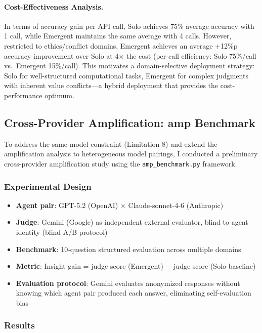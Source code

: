\documentclass[12pt]{article}
\begin{document}
\paragraph{Cost-Effectiveness Analysis.}
In terms of accuracy gain per API call, Solo achieves 75\% average accuracy with 1 call, while Emergent maintains the same average with 4 calls. However, restricted to ethics/conflict domains, Emergent achieves an average +12\%p accuracy improvement over Solo at 4$\times$ the cost (per-call efficiency: Solo 75\%/call vs.\ Emergent 15\%/call). This motivates a domain-selective deployment strategy: Solo for well-structured computational tasks, Emergent for complex judgments with inherent value conflicts---a hybrid deployment that provides the cost-performance optimum.

\subsection{Cross-Provider Amplification: amp Benchmark}
\label{sec:amp_benchmark}

To address the same-model constraint (Limitation 8) and extend the amplification
analysis to heterogeneous model pairings, I conducted a preliminary cross-provider
amplification study using the \texttt{amp\_benchmark.py} framework.

\subsubsection*{Experimental Design}

\begin{itemize}
  \item \textbf{Agent pair}: GPT-5.2 (OpenAI) $\times$ Claude-sonnet-4-6 (Anthropic)
  \item \textbf{Judge}: Gemini (Google) as independent external evaluator, blind to
        agent identity (blind A/B protocol)
  \item \textbf{Benchmark}: 10-question structured evaluation across multiple domains
  \item \textbf{Metric}: Insight gain = judge score (Emergent) $-$ judge score (Solo baseline)
  \item \textbf{Evaluation protocol}: Gemini evaluates anonymized responses without
        knowing which agent pair produced each answer, eliminating self-evaluation bias
\end{itemize}

\subsubsection*{Results}
\end{document}
